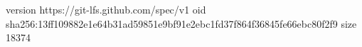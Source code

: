 version https://git-lfs.github.com/spec/v1
oid sha256:13ff109882e1e64b31ad59851e9bf91e2ebc1fd37f864f36845fe66ebc80f2f9
size 18374
